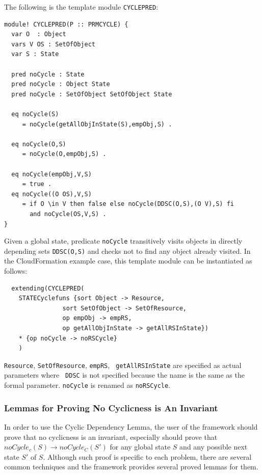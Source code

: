 \documentclass[12pt]{report}
\newcommand{\ra}{\rightarrow}
\newcommand{\stt}[1]{{\small{\tt {#1}}}}
\begin{document}
The following is the template module {\tt CYCLEPRED}:
\begin{verbatim}
module! CYCLEPRED(P :: PRMCYCLE) {
  var O  : Object
  vars V OS : SetOfObject
  var S : State

  pred noCycle : State
  pred noCycle : Object State
  pred noCycle : SetOfObject SetOfObject State

  eq noCycle(S)
     = noCycle(getAllObjInState(S),empObj,S) .

  eq noCycle(O,S)
     = noCycle(O,empObj,S) .

  eq noCycle(empObj,V,S)
     = true .
  eq noCycle((O OS),V,S)
     = if O \in V then false else noCycle(DDSC(O,S),(O V),S) fi
       and noCycle(OS,V,S) .
}
\end{verbatim}
Given a global state, predicate {\tt noCycle} transitively visits
objects in directly depending sets \stt{DDSC(O,S)} and checks not to
find any object already visited. In the CloudFormation example case,
this template module can be instantiated as follows:
\begin{verbatim}
  extending(CYCLEPRED(
  	STATECyclefuns {sort Object -> Resource,
  	       		sort SetOfObject -> SetOfResource,
  	       		op empObj -> empRS,
  	       		op getAllObjInState -> getAllRSInState})
  	* {op noCycle -> noRSCycle}
  	)
\end{verbatim}
 {\tt Resource}, {\tt SetOfResource}, {\tt empRS}, {\tt
   getAllRSInState} are specified as actual parameters where {\tt
   DDSC} is not specified because the name is the same as the formal
 parameter.  {\tt noCycle} is renamed as {\tt noRSCycle}.

\subsubsection{Lemmas for Proving No Cyclicness is An Invariant}
In order to use the Cyclic Dependency Lemma, the user of the framework
should prove that no cyclicness is an invariant, especially should
prove that $noCycle_c(S) \ra noCycle_C(S')$ for any global state $S$
and any possible next state $S'$ of $S$. Although such proof is
specific to each problem, there are several common techniques and the
framework provides several proved lemmas for them.
\end{document}
